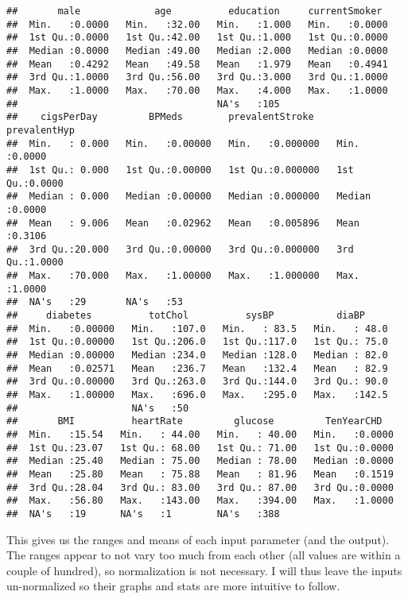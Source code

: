 \documentclass[]{article}
\begin{document}
\begin{verbatim}
##       male             age          education     currentSmoker   
##  Min.   :0.0000   Min.   :32.00   Min.   :1.000   Min.   :0.0000  
##  1st Qu.:0.0000   1st Qu.:42.00   1st Qu.:1.000   1st Qu.:0.0000  
##  Median :0.0000   Median :49.00   Median :2.000   Median :0.0000  
##  Mean   :0.4292   Mean   :49.58   Mean   :1.979   Mean   :0.4941  
##  3rd Qu.:1.0000   3rd Qu.:56.00   3rd Qu.:3.000   3rd Qu.:1.0000  
##  Max.   :1.0000   Max.   :70.00   Max.   :4.000   Max.   :1.0000  
##                                   NA's   :105                     
##    cigsPerDay         BPMeds        prevalentStroke     prevalentHyp   
##  Min.   : 0.000   Min.   :0.00000   Min.   :0.000000   Min.   :0.0000  
##  1st Qu.: 0.000   1st Qu.:0.00000   1st Qu.:0.000000   1st Qu.:0.0000  
##  Median : 0.000   Median :0.00000   Median :0.000000   Median :0.0000  
##  Mean   : 9.006   Mean   :0.02962   Mean   :0.005896   Mean   :0.3106  
##  3rd Qu.:20.000   3rd Qu.:0.00000   3rd Qu.:0.000000   3rd Qu.:1.0000  
##  Max.   :70.000   Max.   :1.00000   Max.   :1.000000   Max.   :1.0000  
##  NA's   :29       NA's   :53                                           
##     diabetes          totChol          sysBP           diaBP      
##  Min.   :0.00000   Min.   :107.0   Min.   : 83.5   Min.   : 48.0  
##  1st Qu.:0.00000   1st Qu.:206.0   1st Qu.:117.0   1st Qu.: 75.0  
##  Median :0.00000   Median :234.0   Median :128.0   Median : 82.0  
##  Mean   :0.02571   Mean   :236.7   Mean   :132.4   Mean   : 82.9  
##  3rd Qu.:0.00000   3rd Qu.:263.0   3rd Qu.:144.0   3rd Qu.: 90.0  
##  Max.   :1.00000   Max.   :696.0   Max.   :295.0   Max.   :142.5  
##                    NA's   :50                                     
##       BMI          heartRate         glucose         TenYearCHD    
##  Min.   :15.54   Min.   : 44.00   Min.   : 40.00   Min.   :0.0000  
##  1st Qu.:23.07   1st Qu.: 68.00   1st Qu.: 71.00   1st Qu.:0.0000  
##  Median :25.40   Median : 75.00   Median : 78.00   Median :0.0000  
##  Mean   :25.80   Mean   : 75.88   Mean   : 81.96   Mean   :0.1519  
##  3rd Qu.:28.04   3rd Qu.: 83.00   3rd Qu.: 87.00   3rd Qu.:0.0000  
##  Max.   :56.80   Max.   :143.00   Max.   :394.00   Max.   :1.0000  
##  NA's   :19      NA's   :1        NA's   :388
\end{verbatim}

This gives us the ranges and means of each input parameter (and the
output). The ranges appear to not vary too much from each other (all
values are within a couple of hundred), so normalization is not
necessary. I will thus leave the inputs un-normalized so their graphs
and stats are more intuitive to follow.
\end{document}
